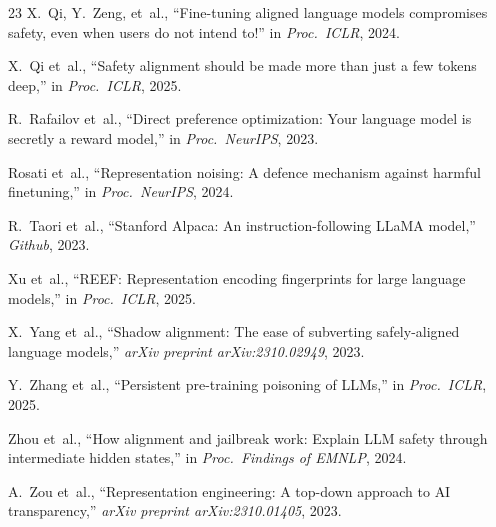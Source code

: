 \documentclass[conference]{IEEEtran}
\begin{document}
\begin{thebibliography}{23}
X.~Qi, Y.~Zeng, et~al.,
``Fine-tuning aligned language models compromises safety, even when users do not intend to!''
in \emph{Proc.\ ICLR}, 2024.

X.~Qi et~al.,
``Safety alignment should be made more than just a few tokens deep,''
in \emph{Proc.\ ICLR}, 2025.

R.~Rafailov et~al.,
``Direct preference optimization: Your language model is secretly a reward model,''
in \emph{Proc.\ NeurIPS}, 2023.

Rosati et~al.,
``Representation noising: A defence mechanism against harmful finetuning,''
in \emph{Proc.\ NeurIPS}, 2024.

R.~Taori et~al.,
``Stanford {Alpaca}: An instruction-following {LLaMA} model,''
\emph{Github}, 2023.

Xu et~al.,
``{REEF}: Representation encoding fingerprints for large language models,''
in \emph{Proc.\ ICLR}, 2025.

X.~Yang et~al.,
``Shadow alignment: The ease of subverting safely-aligned language models,''
\emph{arXiv preprint arXiv:2310.02949}, 2023.

Y.~Zhang et~al.,
``Persistent pre-training poisoning of {LLMs},''
in \emph{Proc.\ ICLR}, 2025.

Zhou et~al.,
``How alignment and jailbreak work: Explain {LLM} safety through intermediate hidden states,''
in \emph{Proc.\ Findings of EMNLP}, 2024.

A.~Zou et~al.,
``Representation engineering: A top-down approach to {AI} transparency,''
\emph{arXiv preprint arXiv:2310.01405}, 2023.

\end{thebibliography}
\end{document}
